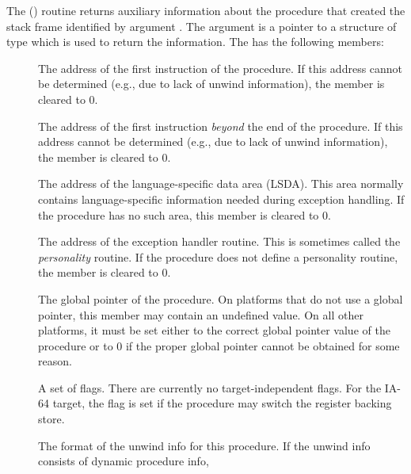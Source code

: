 \documentclass{article}
\begin{document}
The () routine returns auxiliary
information about the procedure that created the stack frame
identified by argument .  The  argument is a pointer
to a structure of type  which is used to
return the information.  The  has the
following members:
\begin{description}
\item[ ] The address of the first
  instruction of the procedure.  If this address cannot be determined
  (e.g., due to lack of unwind information), the 
  member is cleared to 0.  \\
\item[ ] The address of the first
  instruction \emph{beyond} the end of the procedure.  If this address
  cannot be determined (e.g., due to lack of unwind information),
  the  member is cleared to 0.  \\
\item[ ] The address of the
  language-specific data area (LSDA).  This area normally contains
  language-specific information needed during exception handling.  If
  the procedure has no such area, this member is cleared to 0.  \\
\item[ ] The address of the exception
  handler routine.  This is sometimes called the \emph{personality}
  routine.  If the procedure does not define
  a personality routine, the  member is cleared to 0.  \\
\item[ ] The global pointer of the
  procedure.  On platforms that do not use a global pointer, this
  member may contain an undefined value.  On all other platforms, it
  must be set either to the correct global pointer value of the
  procedure or to 0 if the proper global pointer cannot be
  obtained for some reason.  \\
\item[ ] A set of flags.  There are
  currently no target-independent flags.  For the IA-64 target, the
  flag  is set if the
  procedure may switch the register backing store.\\
\item[ ] The format of the unwind info for this
  procedure.  If the unwind info consists of dynamic procedure info,

\end{description}
\end{document}
